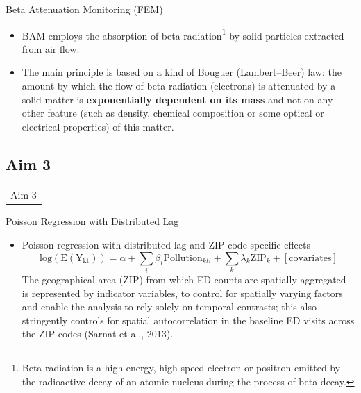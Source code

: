 \documentclass[handout]{beamer} %
\begin{document}
\begin{frame}{Beta Attenuation Monitoring (FEM)}
    \begin{itemize}
        \item BAM employs the absorption of beta radiation\footnote{Beta radiation is a high-energy, high-speed electron or positron emitted by the radioactive decay of an atomic nucleus during the process of beta decay.} by solid particles extracted from air flow. 
        \item The main principle is based on a kind of Bouguer (Lambert–Beer) law: the amount by which the flow of beta radiation (electrons) is attenuated by a solid matter is \textbf{exponentially dependent on its mass} and not on any other feature (such as density, chemical composition or some optical or electrical properties) of this matter.
    \end{itemize}
    
   
\end{frame}


\subsection*{Aim 3}

\begin{frame}{}
    \begin{table}
        \LARGE
        \centering
        \begin{tabular}{c}
             \textcolor[rgb]{0.1,0.1,0.6}{Aim 3}
        \end{tabular}
    \end{table}
\end{frame}

\begin{frame}{Poisson Regression with Distributed Lag}
    \begin{itemize}
        \item Poisson regression with distributed lag and ZIP code-specific effects
            \begin{equation*}
                \mathrm{log(E(Y_{kt}))}=\alpha+\sum_i\beta_i\mathrm{Pollution}_{kti}+\sum_k\lambda_k\mathrm{ZIP}_k+[\mathrm{covariates}]
            \end{equation*}
        \textcolor[rgb]{0.1,0.1,0.6}{The geographical area (ZIP) from which ED counts are spatially aggregated is represented by indicator variables, to control for spatially varying factors and enable the analysis to rely solely on temporal contrasts; this also stringently controls for spatial autocorrelation in the baseline ED visits across the ZIP codes (Sarnat et al., 2013).}
    \end{itemize}
\end{frame}
\end{document}
